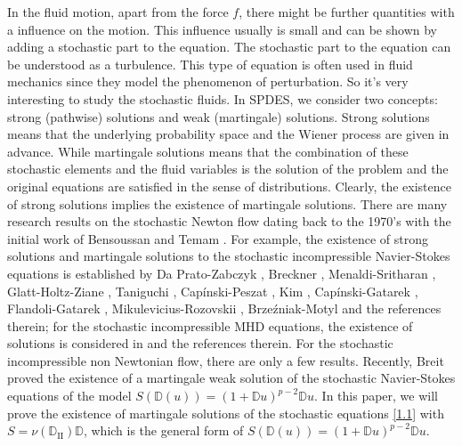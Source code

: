 \documentclass[reqno]{amsart}
\theoremstyle{definition}
\theoremstyle{remark}
\numberwithin{equation}{section} \allowdisplaybreaks
\begin{document}
In the fluid motion, apart from the force $f$, there might be
further quantities with a influence on the motion. This influence
usually is small and can be shown by adding a stochastic part to the
equation. The stochastic part to the equation can be understood as a
turbulence. This type of equation is often used in fluid mechanics
since they model the phenomenon of perturbation.  So it's very
interesting to study the stochastic fluids. In SPDES, we consider
two concepts: strong (pathwise) solutions and
 weak (martingale) solutions. Strong solutions means that the
underlying probability space and the Wiener process are given in
advance. While martingale solutions means that the combination of
these stochastic elements and the fluid variables is the solution of
the problem and the original equations are satisfied in the sense of
distributions. Clearly, the existence of strong solutions implies
the existence of martingale solutions.  There are many research
results on the stochastic Newton flow dating back to the 1970's with
the initial work of Bensoussan and Temam \cite{ABRT}. For example,
 the existence
of strong solutions and martingale solutions to the stochastic
incompressible Navier-Stokes equations is established by Da
Prato-Zabczyk \cite{GDJZ}, Breckner \cite{HB}, Menaldi-Sritharan
\cite{JLMSSS}, Glatt-Holtz-Ziane \cite{NGMZ}, Taniguchi \cite{TT},
Cap\'{i}nski-Peszat \cite{MCSP,CP-2001}, Kim \cite{JUK},
Cap\'{i}nski-Gatarek \cite{CG-1994}, Flandoli-Gatarek \cite{FG},
Mikulevicius-Rozovskii \cite{MB-2004, MB-2005}, Brze\'{z}niak-Motyl
\cite{BM} and the references therein; for the stochastic
incompressible MHD equations, the existence of solutions is
considered in \cite{ZTDWHW} and the references therein. For the
stochastic incompressible non Newtonian flow, there are only a few
results. Recently, Breit \cite{BD} proved the existence of a
martingale weak solution of the stochastic Navier-Stokes equations
of the model $S(\mathbb{D}(u))=(1+\mathbb{D}u)^{p-2}\mathbb{D}u$. In
this paper, we will prove the existence of martingale solutions of
the stochastic equations \eqref{1.1} with
$S=\nu(\mathbb{D}_{\text{II}})\mathbb{D}$, which is the general form
of $S(\mathbb{D}(u))=(1+\mathbb{D}u)^{p-2}\mathbb{D}u$.
\end{document}
